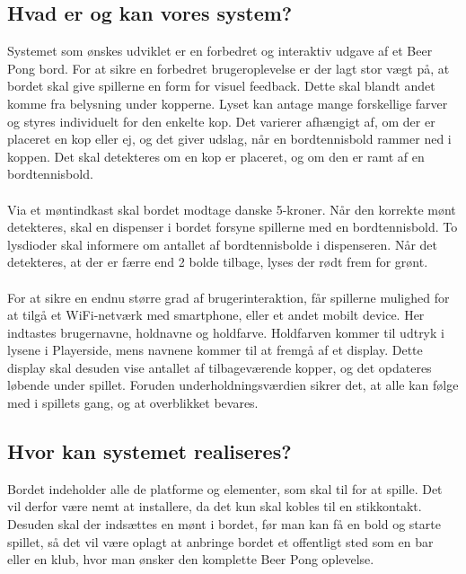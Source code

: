 \documentclass[Rapport/Rapport_main.tex]{subfiles}
\begin{document}
\subsection{Hvad er og kan vores system?}
Systemet som ønskes udviklet er en forbedret og interaktiv udgave af et Beer Pong bord. For at sikre en forbedret brugeroplevelse er der lagt stor vægt på, at bordet skal give spillerne en form for visuel feedback. Dette skal blandt andet komme fra belysning under kopperne. Lyset kan antage mange forskellige farver og styres individuelt for den enkelte kop. Det varierer afhængigt af, om der er placeret en kop eller ej, og det giver udslag, når en bordtennisbold rammer ned i koppen. Det skal detekteres om en kop er placeret, og om den er ramt af en bordtennisbold.\\\\Via et møntindkast skal bordet modtage danske 5-kroner. Når den korrekte mønt detekteres, skal en dispenser i bordet forsyne spillerne med en bordtennisbold. To lysdioder skal informere om antallet af bordtennisbolde i dispenseren. Når det detekteres, at der er færre end 2 bolde tilbage, lyses der rødt frem for grønt.\\\\For at sikre en endnu større grad af brugerinteraktion, får spillerne mulighed for at tilgå et WiFi-netværk med smartphone, eller et andet mobilt device. Her indtastes brugernavne, holdnavne og holdfarve. Holdfarven kommer til udtryk i lysene i Playerside, mens navnene kommer til at fremgå af et display. Dette display skal desuden vise antallet af tilbageværende kopper, og det opdateres løbende under spillet. Foruden underholdningsværdien sikrer det, at alle kan følge med i spillets gang, og at overblikket bevares.

\subsection{Hvor kan systemet realiseres?}
Bordet indeholder alle de platforme og elementer, som skal til for at spille. Det vil derfor være nemt at installere, da det kun skal kobles til en stikkontakt. Desuden skal der indsættes en mønt i bordet, før man kan få en bold og starte spillet, så det vil være oplagt at anbringe bordet et offentligt sted som en bar eller en klub, hvor man ønsker den komplette Beer Pong oplevelse.
\end{document}
